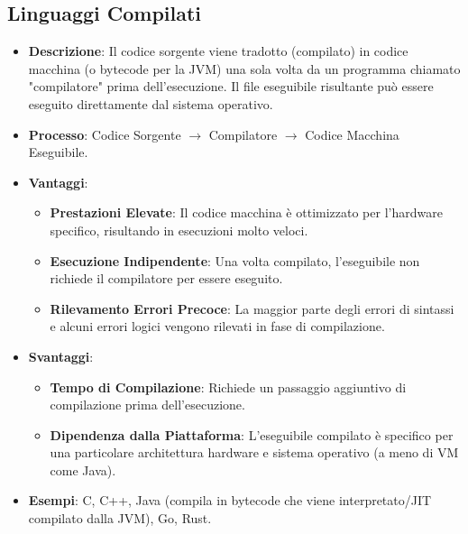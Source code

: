 \subsection{Linguaggi Compilati}
\begin{itemize}
    \item \textbf{Descrizione}: Il codice sorgente viene tradotto (compilato) in codice macchina (o bytecode per la JVM) una sola volta da un programma chiamato "compilatore" prima dell'esecuzione. Il file eseguibile risultante può essere eseguito direttamente dal sistema operativo.
    \item \textbf{Processo}: Codice Sorgente $\rightarrow$ Compilatore $\rightarrow$ Codice Macchina Eseguibile.
    \item \textbf{Vantaggi}:
    \begin{itemize}
        \item \textbf{Prestazioni Elevate}: Il codice macchina è ottimizzato per l'hardware specifico, risultando in esecuzioni molto veloci.
        \item \textbf{Esecuzione Indipendente}: Una volta compilato, l'eseguibile non richiede il compilatore per essere eseguito.
        \item \textbf{Rilevamento Errori Precoce}: La maggior parte degli errori di sintassi e alcuni errori logici vengono rilevati in fase di compilazione.
    \end{itemize}
    \item \textbf{Svantaggi}:
    \begin{itemize}
        \item \textbf{Tempo di Compilazione}: Richiede un passaggio aggiuntivo di compilazione prima dell'esecuzione.
        \item \textbf{Dipendenza dalla Piattaforma}: L'eseguibile compilato è specifico per una particolare architettura hardware e sistema operativo (a meno di VM come Java).
    \end{itemize}
    \item \textbf{Esempi}: C, C++, Java (compila in bytecode che viene interpretato/JIT compilato dalla JVM), Go, Rust.
\end{itemize}

